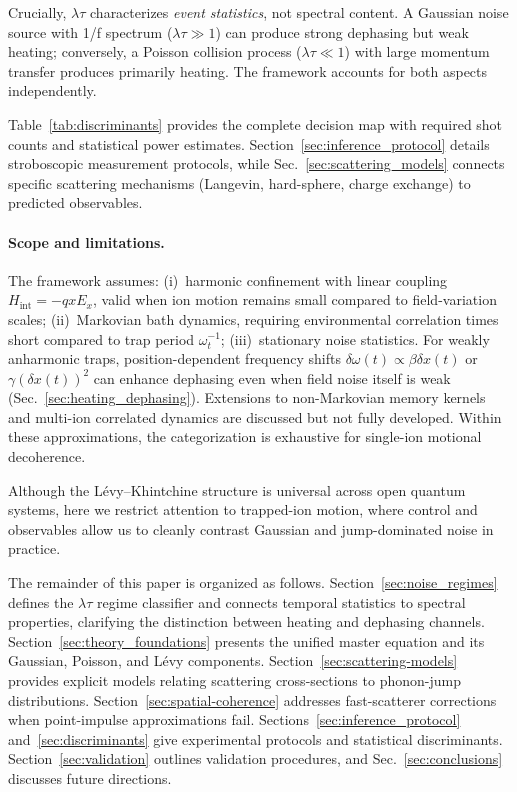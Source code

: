 Crucially, $\lambda\tau$ characterizes \emph{event statistics}, not spectral content. A Gaussian noise source with 1/f spectrum ($\lambda\tau \gg 1$) can produce strong dephasing but weak heating; conversely, a Poisson collision process ($\lambda\tau \ll 1$) with large momentum transfer produces primarily heating. The framework accounts for both aspects independently.

Table~\ref{tab:discriminants} provides the complete decision map with required shot counts and statistical power estimates. Section~\ref{sec:inference_protocol} details stroboscopic measurement protocols, while Sec.~\ref{sec:scattering_models} connects specific scattering mechanisms (Langevin, hard-sphere, charge exchange) to predicted observables.

\paragraph{Scope and limitations.}
The framework assumes: (i)~harmonic confinement with linear coupling $H_{\text{int}} = -qxE_x$, valid when ion motion remains small compared to field-variation scales; (ii)~Markovian bath dynamics, requiring environmental correlation times short compared to trap period $\omega_t^{-1}$; (iii)~stationary noise statistics. For weakly anharmonic traps, position-dependent frequency shifts $\delta\omega(t) \propto \beta \delta x(t)$ or $\gamma (\delta x(t))^2$ can enhance dephasing even when field noise itself is weak (Sec.~\ref{sec:heating_dephasing}). Extensions to non-Markovian memory kernels and multi-ion correlated dynamics are discussed but not fully developed. Within these approximations, the categorization is exhaustive for single-ion motional decoherence.

Although the L\'evy--Khintchine structure is universal across open quantum systems, here we restrict attention to trapped-ion motion, where control and observables allow us to cleanly contrast Gaussian and jump-dominated noise in practice.

The remainder of this paper is organized as follows. Section~\ref{sec:noise_regimes} defines the $\lambda\tau$ regime classifier and connects temporal statistics to spectral properties, clarifying the distinction between heating and dephasing channels. Section~\ref{sec:theory_foundations} presents the unified master equation and its Gaussian, Poisson, and L\'evy components. Section~\ref{sec:scattering-models} provides explicit models relating scattering cross-sections to phonon-jump distributions. Section~\ref{sec:spatial-coherence} addresses fast-scatterer corrections when point-impulse approximations fail. Sections~\ref{sec:inference_protocol} and~\ref{sec:discriminants} give experimental protocols and statistical discriminants. Section~\ref{sec:validation} outlines validation procedures, and Sec.~\ref{sec:conclusions} discusses future directions.

